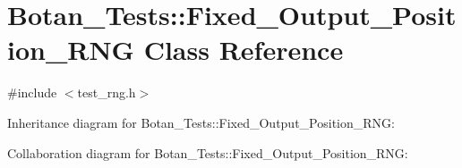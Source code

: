 \hypertarget{class_botan___tests_1_1_fixed___output___position___r_n_g}{}\section{Botan\+\_\+\+Tests\+:\+:Fixed\+\_\+\+Output\+\_\+\+Position\+\_\+\+R\+NG Class Reference}
\label{class_botan___tests_1_1_fixed___output___position___r_n_g}


{\ttfamily \#include $<$test\+\_\+rng.\+h$>$}



Inheritance diagram for Botan\+\_\+\+Tests\+:\+:Fixed\+\_\+\+Output\+\_\+\+Position\+\_\+\+R\+NG\+:


Collaboration diagram for Botan\+\_\+\+Tests\+:\+:Fixed\+\_\+\+Output\+\_\+\+Position\+\_\+\+R\+NG\+:
